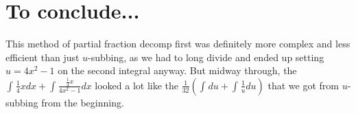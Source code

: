 \documentclass[12pt]{article}
\begin{document}
\section{To conclude...}
This method of partial fraction decomp first was definitely more complex and less efficient than just $u$-subbing, as we had to long divide and ended up setting $u=4x^2-1$ on the second integral anyway. But midway through, the $\int_{ }^{ }\frac{1}{4}xdx+\int_{ }^{ }\frac{\frac{1}{4}x}{4x^{2}-1}dx$ looked a lot like the $\frac{1}{32}\left(\int_{ }^{ }du+\int_{ }^{ }\frac{1}{u}du\right)$ that we got from $u$-subbing from the beginning.
\end{document}

